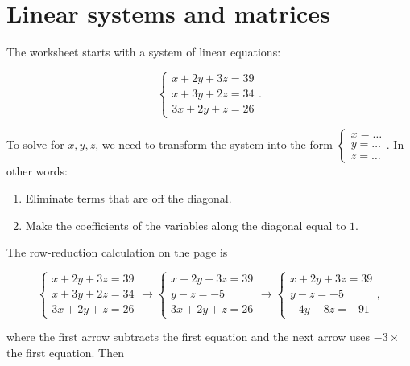 \chapter{Linear systems and matrices}

The worksheet starts with a system of linear equations:

\[\left\{ \begin{matrix}
{x + 2y + 3z = 39} \\
{x + 3y + 2z = 34} \\
{3x + 2y + z = 26}
\end{matrix} \right..\]

To solve for \(x,y,z\), we need to transform the system into the form \(\left\{ \begin{matrix}
{x = \ldots} \\
{y = \ldots} \\
{z = \ldots}
\end{matrix} \right.\). In other words:

\begin{enumerate}
\tightlist
\item
  Eliminate terms that are off the diagonal.
\item
  Make the coefficients of the variables along the diagonal equal to \(1\).
\end{enumerate}

The row-reduction calculation on the page is

\[\left\{ \begin{matrix}
{x + 2y + 3z = 39} \\
{x + 3y + 2z = 34} \\
{3x + 2y + z = 26}
\end{matrix} \right.\rightarrow\left\{ \begin{matrix}
{x + 2y + 3z = 39} \\
{y - z = - 5} \\
{3x + 2y + z = 26}
\end{matrix} \right.\rightarrow\left\{ \begin{matrix}
{x + 2y + 3z = 39} \\
{y - z = - 5} \\
{- 4y - 8z = - 91}
\end{matrix} \right.,\]

where the first arrow subtracts the first equation and the next arrow uses \(- 3 \times\) the first equation. Then

